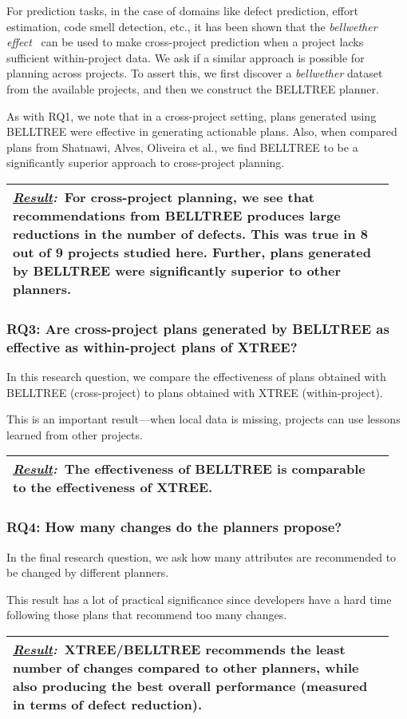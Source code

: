 \documentclass[10pt, journal, compsoc]{IEEEtran}
\newcommand{\result}[1]{
\vspace{0.2cm}
\noindent\begin{minipage}{\linewidth}
\begin{tabular}{|p{0.95\linewidth}|}
\hline\vspace{-0.2cm}
\textbf{\textit{\underline{Result}:}}~#1\\\hline
\end{tabular}
\end{minipage}\bigstrut
}
\begin{document}
For prediction tasks, in the case of domains like defect prediction, effort estimation, code smell detection, etc., it has been shown that the \textit{bellwether effect}~\cite{krishna17a} can be used to make cross-project prediction when a project lacks sufficient within-project data. We ask if a similar approach is possible for planning across projects. To assert this, we first discover a \textit{bellwether} dataset from the available projects, and then we construct the BELLTREE planner. 

As with RQ1, we note that in a cross-project setting, plans generated using BELLTREE were  effective in generating actionable plans. Also, when compared plans from
Shatnawi, Alves, Oliveira et al., we find BELLTREE to be a significantly superior approach to cross-project planning.

\result{For cross-project planning, we see that recommendations from BELLTREE produces large reductions in the number of defects. This was true in 8 out of 9 projects studied here. Further, plans generated by BELLTREE were significantly superior to other planners.}


\subsubsection*{RQ3: Are cross-project plans generated by BELLTREE as effective as within-project plans of XTREE?}

In this research question, we compare the effectiveness of plans obtained with BELLTREE (cross-project) to plans obtained with XTREE (within-project). 

This is an important result---when local data is missing,  projects can use lessons learned from other projects.

\result{The effectiveness of BELLTREE is comparable to the effectiveness of XTREE.}

\subsubsection*{RQ4: How many changes do the planners propose?}

In the final research question, we ask how many attributes are recommended to be changed by different planners.

This result has a lot of practical significance since developers have a hard time following those plans that recommend too many changes.


\result{XTREE/BELLTREE recommends the least number of changes compared to other planners,  while also producing the best overall performance (measured in
terms of defect reduction).}
\end{document}
